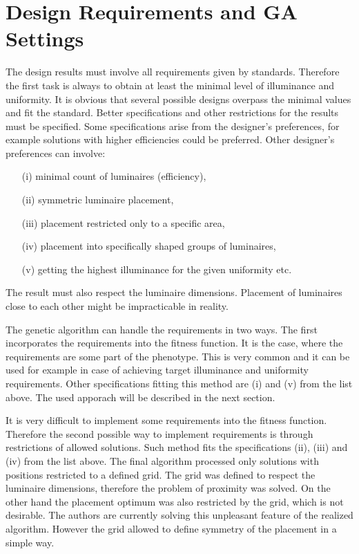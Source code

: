 \section{Design Requirements and GA Settings}
The design results must involve all requirements given by standards. Therefore the first task is always to obtain at least the minimal level of illuminance and uniformity. It is obvious that several possible designs overpass the minimal values and fit the standard. Better specifications and other restrictions for the results must be specified. Some specifications arise from the designer's preferences, for example solutions with higher efficiencies could be preferred. Other designer's preferences can involve:

\begin{enumerate}
	\item[(i)] minimal count of luminaires (efficiency),
	\item[(ii)] symmetric luminaire placement,
	\item[(iii)] placement restricted only to a specific area,
	\item[(iv)] placement into specifically shaped groups of luminaires,
	\item[(v)] getting the highest illuminance for the given uniformity etc.
\end{enumerate}

The result must also respect the luminaire dimensions. Placement of luminaires close to each other might be impracticable in reality.

The genetic algorithm can handle the requirements in two ways. The first incorporates the requirements into the fitness function. It is the case, where the requirements are some part of the phenotype. This is very common and it can be used for example in case of achieving target illuminance and uniformity requirements. Other specifications fitting this method are (i) and (v) from the list above. The used apporach will be described in the next section. 

It is very difficult to implement some requirements into the fitness function. Therefore the second possible way to implement requirements is through restrictions of allowed solutions. Such method fits the specifications (ii), (iii) and (iv) from the list above. The final algorithm processed only solutions with positions restricted to a defined grid. The grid was defined to respect the luminaire dimensions, therefore the problem of proximity was solved. On the other hand the placement optimum was also restricted by the grid, which is not desirable. The authors are currently solving this unpleasant feature of the realized algorithm. However the grid allowed to define symmetry of the placement in a simple way.


